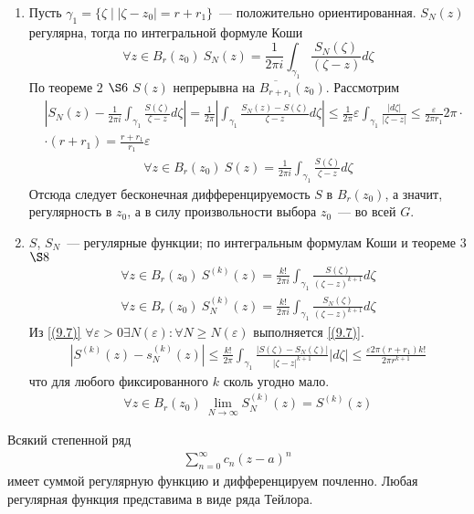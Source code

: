 \begin{enumerate}
    \item Пусть $\gamma_1 = \{\zeta \mid \left| \zeta - z_0 \right| =
    r+r_1\}$~--- положительно ориентированная.
    $S_N(z)$ регулярна, тогда по интегральной формуле Коши
    \begin{equation}\label{(9.9)}
        \forall z \in B_r(z_0) \ S_N(z) = \frac{1}{2 \pi i}\int_{\gamma_1}\frac{S_N(\zeta)}{(\zeta - z)}d \zeta
    \end{equation}
    По теореме $2$ $\S 6$ $S(z)$ непрерывна на $\overline{B_{r+r_1}}(z_0)$.
    Рассмотрим
    \begin{align*}
      & \left| S_N(z) - \frac{1}{2 \pi i}\int_{\gamma_1}\frac{S(\zeta)}{\zeta - z} d\zeta \right| = \frac{1}{2 \pi}\left| \int_{\gamma_1} \frac{S_N(z) - S(\zeta)}{\zeta - z} d \zeta \right| \leq \frac{1}{2 \pi} \varepsilon \int_{\gamma_1}\frac{\left| d \zeta \right|}{\left| \zeta - z \right|} \leq \frac{\varepsilon}{2 \pi r_1}2 \pi \cdot \\
      & \cdot (r+r_1) = \frac{r+r_1}{r_1}\varepsilon
    \end{align*}
    \begin{align*}
      \forall z \in B_r(z_0) \ S(z) = \frac{1}{2\pi i}\int_{\gamma_1}\frac{S(\zeta)}{\zeta - z}d\zeta
    \end{align*}
    Отсюда следует бесконечная дифференцируемость $S$ в $B_r(z_0)$, а значит,
    регулярность в $z_0$, а в силу произвольности выбора $z_0$~--- во всей $G$.
    \item $S$, $S_N$~--- регулярные функции; по интегральным формулам Коши и
    теореме $3$ $\S 8$
    \begin{align*}
      \forall z \in B_r(z_0) \ S^{(k)}(z) = \frac{k!}{2 \pi i} \int_{\gamma_1} \frac{S(\zeta)}{(\zeta - z)^{k+1}}d\zeta
    \end{align*}
    \begin{align*}
      \forall z \in B_r(z_0) \ S_N^{(k)}(z) = \frac{k!}{2 \pi i}\int_{\gamma_1}\frac{S_N(\zeta)}{(\zeta - z)^{k+1}} d \zeta 
    \end{align*}
    Из \eqref{(9.7)} $\forall \varepsilon > 0 \exists N(\varepsilon): \forall
    N\geq N(\varepsilon)$ выполняется \eqref{(9.7)}.
    \begin{align*}
      \left| S^{(k)}(z) - s_N^{(k)}(z) \right| \leq \frac{k!}{2\pi}\int_{\gamma_1}\frac{\left| S(\zeta) - S_N(\zeta) \right|}{\left| \zeta - z \right|^{k+1}} \left| d\zeta \right|\leq \frac{\varepsilon 2 \pi (r+r_1)k!}{2 \pi r^{k+1}}
    \end{align*}
    что для любого фиксированного $k$ сколь угодно мало.
    \begin{align*}
      \forall z \in B_r(z_0) \ \lim_{N \to \infty}S^{(k)}_N (z) = S^{(k)}(z)
    \end{align*}
\end{enumerate}
\corollary
Всякий степенной ряд
\begin{align*}
  \sum_{n=0}^{\infty}c_n(z-a)^n
\end{align*}
имеет суммой регулярную функцию и дифференцируем почленно.
\corollary
Любая регулярная функция представима в виде ряда Тейлора.
